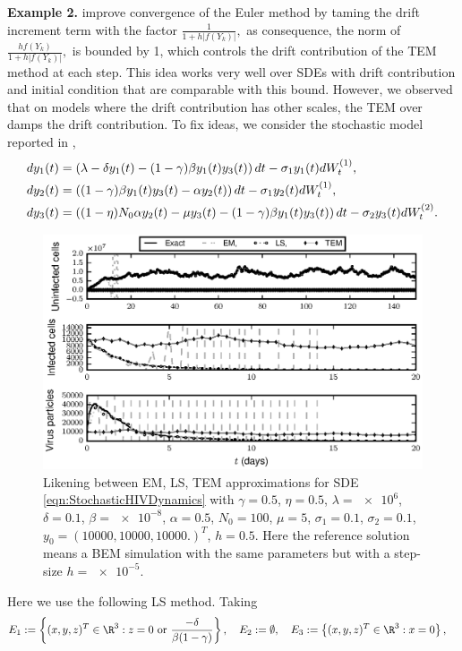 \documentclass[sort&compress, preprint]{elsarticle}
\theoremstyle{definition}
\theoremstyle{plain}%
\theoremstyle{remark}
\newcommand{\SM}{LS\xspace}
\begin{document}
	
{\textbf{Example 2.}}
	\citeauthor{Hutzenthaler2012a} improve convergence of the Euler method by taming the drift increment term with 
	the factor
	$
	\frac{1}{1 + h |f(Y_k)|},
	$
	as consequence, the norm of  
	$
	\frac{h f(Y_k)}{1 + h |f(Y_k)|},
	$ is bounded by 1, which  controls the drift contribution of the TEM method at each step. This idea works very well
	over SDEs with drift contribution and initial condition that are comparable with this bound. However, we observed
	that on models where the	drift contribution has other scales, the TEM over damps the drift contribution. To fix
	ideas, we consider the	stochastic model reported in \cite{Dalal2008},
	\begin{align}\label{eqn:StochasticHIVDynamics}
	dy_1(t) &=
	\left(
	\lambda -\delta y_1(t) - (1 - \gamma) \beta y_1(t) y_3(t)
	\right)dt
	-\sigma_1 y_1(t) dW^{(1)}_t, 
	\notag \\
	dy_2(t) &= 
	\left(
	(1- \gamma) \beta y_1(t) y_3(t) - \alpha y_2(t) 
	\right)dt
	-\sigma_1 y_2(t) dW^{(1)}_t, 
	\\
	dy_3(t) & = 
	\left(
	(1 - \eta) N_0 \alpha y_2(t) 
	-\mu y_3(t)
	-(1 - \gamma ) \beta y_1(t) y_3(t) 
	\right)dt
	- \sigma_2 y_3(t) dW^{(2)}_t.
	\notag
	\end{align}	
	\begin{figure}[h!]
		\centering
		\includegraphics{./InternalHIVDynamics5e-1}
		\caption{
			Likening between EM, \SM, TEM approximations for SDE \eqref{eqn:StochasticHIVDynamics} with
			$\gamma = \num{0.5}$,
			$\eta = \num{0.5}$,
			$\lambda = \num{e6}$, 
			$\delta = \num{0.1}$,
			$\beta = \num{e-8}$,
			$\alpha = \num{0.5}$,
			$N_0= \num{100}$,
			$\mu = \num{5}$,
			$\sigma_1 = \num{0.1}$,
			$\sigma_2 = \num{0.1} $,
			$y_0 = (
				\num{10000},%
				\num{10000},%
				\num{10000}.%
			)^T$,
			$h=\num{0.5}$.
			Here the reference solution means a BEM simulation
			with the same parameters but with a step-size $h=\num{e-5}$.
		}
		\label{fig:InternalHIVDynamics5e-1}
	\end{figure} 
	Here we use the following \SM method. Taking 
	\begin{align*}
		E_1&:=	\left\{
			(x,y,z)^T \in \R^3:
			z=0 \text{ or }
			\frac{-\delta}{\beta(1-\gamma)}
		\right\}, \quad
		E_2:=	\emptyset, \quad   %
		E_3:=  \left\{ (x,y,z)^T \in \R^3: x=0 \right\},
	\end{align*}
	
\end{document}
